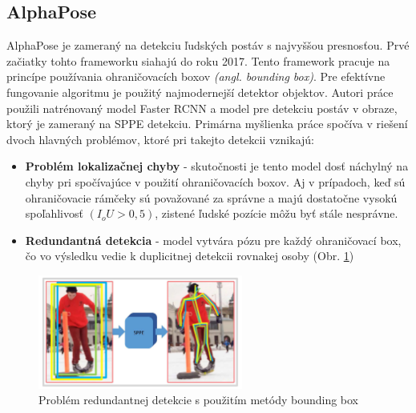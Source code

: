 \documentclass[slovak,master,dept460,male,cpp,cpdeclaration]{diploma}
\begin{document}
\subsection{AlphaPose}
AlphaPose\cite{fang2017rmpe} je zameraný na detekciu ľudských postáv s najvyššou presnosťou. Prvé začiatky tohto frameworku siahajú do roku 2017. Tento framework pracuje na princípe používania ohraničovacích boxov \textit{(angl. bounding box)}. Pre efektívne fungovanie algoritmu je použitý najmodernejší detektor objektov. Autori práce použili natrénovaný model Faster RCNN\cite{ren2015faster} a model pre detekciu postáv v obraze\cite{newell2016stacked}, ktorý je zameraný na SPPE detekciu. Primárna myšlienka práce spočíva v riešení dvoch hlavných problémov, ktoré pri takejto detekcii vznikajú:
\begin{itemize}
\item \textbf{Problém lokalizačnej chyby} - skutočnosti je tento model dosť náchylný na chyby pri spočívajúce v použití ohraničovacích boxov. Aj v prípadoch, keď sú ohraničovacie rámčeky
sú považované za správne a majú dostatočne vysokú spoľahlivosť \textit{$(I_oU > 0,5)$}, zistené ľudské pozície môžu byť stále nesprávne. 
\item \textbf{Redundantná detekcia} - model vytvára pózu pre každý ohraničovací box, čo vo výsledku vedie k duplicitnej detekcii rovnakej osoby (Obr. \ref{fig:alphaPoseRedundant})
\end{itemize}

\begin{figure}[H]
	\centering
	\includegraphics[width=0.6\textwidth]{Figures/alphaPoseRedundant.png}
	\caption{Problém redundantnej detekcie s použitím metódy bounding box\cite{fang2017rmpe}}
	\label{fig:alphaPoseRedundant}
\end{figure}
\end{document}
